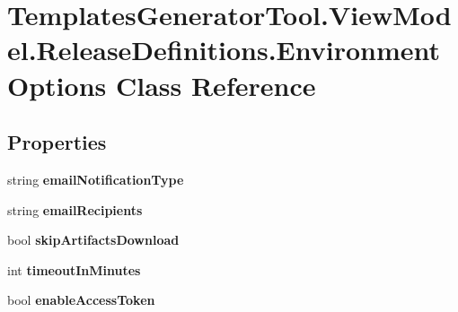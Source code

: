 \hypertarget{class_templates_generator_tool_1_1_view_model_1_1_release_definitions_1_1_environment_options}{}\section{Templates\+Generator\+Tool.\+View\+Model.\+Release\+Definitions.\+Environment\+Options Class Reference}
\label{class_templates_generator_tool_1_1_view_model_1_1_release_definitions_1_1_environment_options}
\subsection*{Properties}
\begin{DoxyCompactItemize}
\item 
\mbox{\label{class_templates_generator_tool_1_1_view_model_1_1_release_definitions_1_1_environment_options_a10743b059e04309bfa19380d137eaff9}} 
string {\bfseries email\+Notification\+Type}
\item 
\mbox{\label{class_templates_generator_tool_1_1_view_model_1_1_release_definitions_1_1_environment_options_ab193bc4f33a573f97b84f98cc88bbf2b}} 
string {\bfseries email\+Recipients}
\item 
\mbox{\label{class_templates_generator_tool_1_1_view_model_1_1_release_definitions_1_1_environment_options_ab280afb8fa6934687621b16d1b874459}} 
bool {\bfseries skip\+Artifacts\+Download}
\item 
\mbox{\label{class_templates_generator_tool_1_1_view_model_1_1_release_definitions_1_1_environment_options_a5798e4d3007cc184a8861be6a7165ecf}} 
int {\bfseries timeout\+In\+Minutes}
\item 
\mbox{\label{class_templates_generator_tool_1_1_view_model_1_1_release_definitions_1_1_environment_options_a4e06f45aad915ab7f64568264ba00354}} 
bool {\bfseries enable\+Access\+Token}
\end{DoxyCompactItemize}


